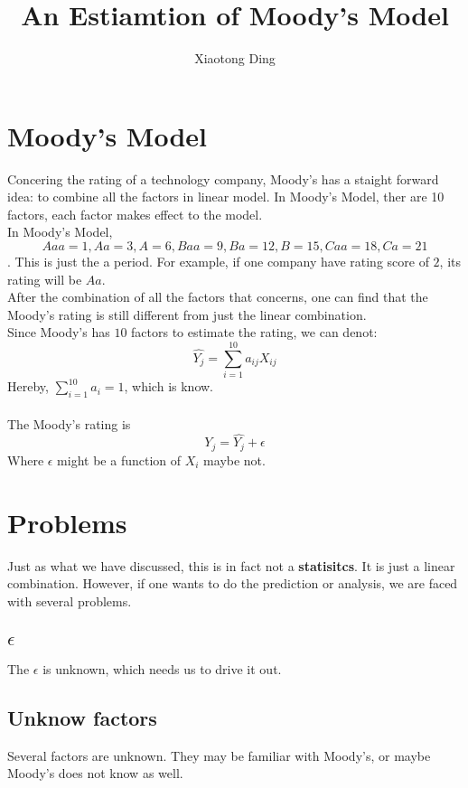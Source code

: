 \documentclass[11pt]{article}
\title{An Estiamtion of Moody's Model}
\author{Xiaotong Ding}
\begin{document}
\maketitle
\section{Moody's Model}
Concering the rating of a technology company, Moody's has a staight forward idea: to combine all the factors in linear model.    In Moody's Model, ther are 10 factors, each factor makes effect to the model. \\
In Moody's Model, $$Aaa=1,Aa=3,A=6,Baa=9,Ba=12,B=15,Caa=18,Ca=21$$. This is just the a period. For example, if one company have rating score of $2$, its rating will be $Aa$.\\
After the combination of all the factors that concerns, one can find that the Moody's rating is still different from just the linear combination.\\
Since Moody's has $10$ factors to estimate the rating, we can denot:
\begin{equation}
\hat{Y_j}=\sum_{i=1}^{10} a_{ij} X_{ij}
\end{equation}
Hereby, $\sum_{i=1}^{10} a_i=1$, which is know.\\
\\
The Moody's rating is
\begin{equation}
Y_j=\hat{Y_j}+\epsilon
\end{equation}
Where $\epsilon$ might be a function of $X_i$ maybe not. \\
\section{Problems}
Just as what we have discussed, this is in fact not a \textbf{statisitcs}. It is just a linear combination. However, if one wants to do the prediction or analysis, we are faced with several problems.\\
\subsection{$\epsilon$}
The $\epsilon$ is unknown, which needs us to drive it out.
\subsection{Unknow factors}
Several factors are unknown. They may be familiar with Moody's, or maybe Moody's does not know as well.
\end{document}
